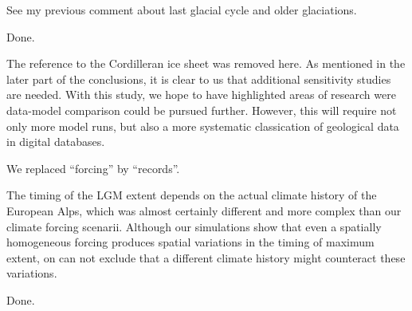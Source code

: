 
    See my previous comment about last glacial cycle and older glaciations.


    Done.


    The reference to the Cordilleran ice sheet was removed here. As mentioned
    in the later part of the conclusions, it is clear to us that additional
    sensitivity studies are needed. With this study, we hope to have
    highlighted areas of research were data-model comparison could be pursued
    further. However, this will require not only more model runs, but also a
    more systematic classication of geological data in digital databases.


    We replaced ``forcing'' by ``records''.


    The timing of the LGM extent depends on the actual climate history of the
    European Alps, which was almost certainly different and more complex than
    our climate forcing scenarii.  Although our simulations show that even a
    spatially homogeneous forcing produces spatial variations in the timing of
    maximum extent, on can not exclude that a different climate history might
    counteract these variations.


    Done.


